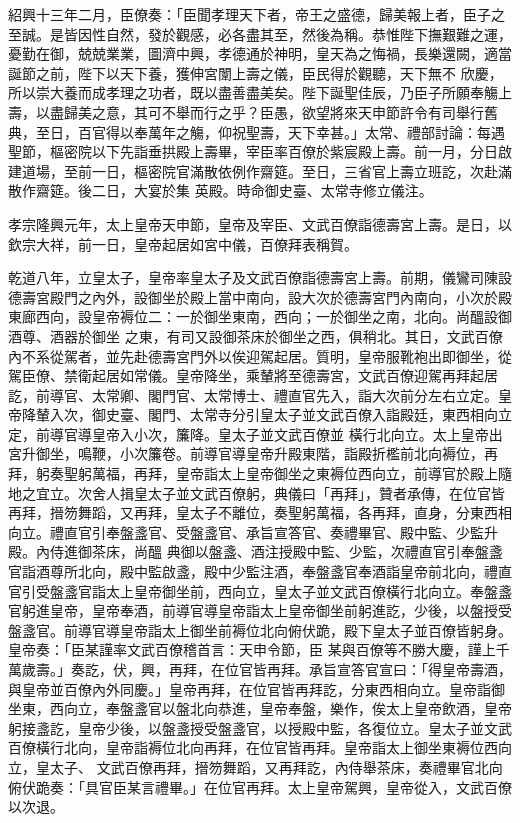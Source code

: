 \begin{pinyinscope}
 紹興十三年二月，臣僚奏：「臣聞孝理天下者，帝王之盛德，歸美報上者，臣子之至誠。是皆因性自然，發於觀感，必各盡其至，然後為稱。恭惟陛下撫艱難之運，憂勤在御，兢兢業業，圖濟中興，孝德通於神明，皇天為之悔禍，長樂還闕，適當誕節之前，陛下以天下養，獲伸宮闈上壽之儀，臣民得於觀聽，天下無不
 欣慶，所以崇大養而成孝理之功者，既以盡善盡美矣。陛下誕聖佳辰，乃臣子所願奉觴上壽，以盡歸美之意，其可不舉而行之乎？臣愚，欲望將來天申節許令有司舉行舊典，至日，百官得以奉萬年之觴，仰祝聖壽，天下幸甚。」太常、禮部討論：每遇聖節，樞密院以下先詣垂拱殿上壽畢，宰臣率百僚於紫宸殿上壽。前一月，分日啟建道場，至前一日，樞密院官滿散依例作齋筵。至日，三省官上壽立班訖，次赴滿散作齋筵。後二日，大宴於集
 英殿。時命御史臺、太常寺修立儀注。



 孝宗隆興元年，太上皇帝天申節，皇帝及宰臣、文武百僚詣德壽宮上壽。是日，以欽宗大祥，前一日，皇帝起居如宮中儀，百僚拜表稱賀。



 乾道八年，立皇太子，皇帝率皇太子及文武百僚詣德壽宮上壽。前期，儀鸞司陳設德壽宮殿門之內外，設御坐於殿上當中南向，設大次於德壽宮門內南向，小次於殿東廊西向，設皇帝褥位二：一於御坐東南，西向；一於御坐之南，北向。尚醞設御酒尊、酒器於御坐
 之東，有司又設御茶床於御坐之西，俱稍北。其日，文武百僚內不系從駕者，並先赴德壽宮門外以俟迎駕起居。質明，皇帝服靴袍出即御坐，從駕臣僚、禁衛起居如常儀。皇帝降坐，乘輦將至德壽宮，文武百僚迎駕再拜起居訖，前導官、太常卿、閣門官、太常博士、禮直官先入，詣大次前分左右立定。皇帝降輦入次，御史臺、閣門、太常寺分引皇太子並文武百僚入詣殿廷，東西相向立定，前導官導皇帝入小次，簾降。皇太子並文武百僚並
 橫行北向立。太上皇帝出宮升御坐，鳴鞭，小次簾卷。前導官導皇帝升殿東階，詣殿折檻前北向褥位，再拜，躬奏聖躬萬福，再拜，皇帝詣太上皇帝御坐之東褥位西向立，前導官於殿上隨地之宜立。次舍人揖皇太子並文武百僚躬，典儀曰「再拜」，贊者承傳，在位官皆再拜，搢笏舞蹈，又再拜，皇太子不離位，奏聖躬萬福，各再拜，直身，分東西相向立。禮直官引奉盤盞官、受盤盞官、承旨宣答官、奏禮畢官、殿中監、少監升殿。內侍進御茶床，尚醞
 典御以盤盞、酒注授殿中監、少監，次禮直官引奉盤盞官詣酒尊所北向，殿中監啟盞，殿中少監注酒，奉盤盞官奉酒詣皇帝前北向，禮直官引受盤盞官詣太上皇帝御坐前，西向立，皇太子並文武百僚橫行北向立。奉盤盞官躬進皇帝，皇帝奉酒，前導官導皇帝詣太上皇帝御坐前躬進訖，少後，以盤授受盤盞官。前導官導皇帝詣太上御坐前褥位北向俯伏跪，殿下皇太子並百僚皆躬身。皇帝奏：「臣某謹率文武百僚稽首言：天申令節，臣
 某與百僚等不勝大慶，謹上千萬歲壽。」奏訖，伏，興，再拜，在位官皆再拜。承旨宣答官宣曰：「得皇帝壽酒，與皇帝並百僚內外同慶。」皇帝再拜，在位官皆再拜訖，分東西相向立。皇帝詣御坐東，西向立，奉盤盞官以盤北向恭進，皇帝奉盤，樂作，俟太上皇帝飲酒，皇帝躬接盞訖，皇帝少後，以盤盞授受盤盞官，以授殿中監，各復位立。皇太子並文武百僚橫行北向，皇帝詣褥位北向再拜，在位官皆再拜。皇帝詣太上御坐東褥位西向立，皇太子、
 文武百僚再拜，搢笏舞蹈，又再拜訖，內侍舉茶床，奏禮畢官北向俯伏跪奏：「具官臣某言禮畢。」在位官再拜。太上皇帝駕興，皇帝從入，文武百僚以次退。




\end{pinyinscope}
